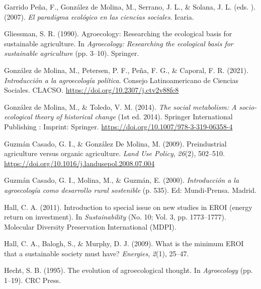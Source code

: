 \documentclass[a4paper, nobind]{templates/ociamthesis}
\newlength{\cslhangindent}
\newenvironment{CSLReferences}[2] %
 {%
  \setlength{\parindent}{0pt}
  \ifodd #1
  \let\oldpar\par
  \def\par{\hangindent=\cslhangindent\oldpar}
  \fi
  \setlength{\parskip}{1mm}
  \setlength{\baselineskip}{6mm}
 }%
 {}
\begin{document}
\begin{CSLReferences}{1}{0}
\leavevmode{}%
Garrido Peña, F., González de Molina, M., Serrano, J. L., \& Solana, J. L. (eds. ). (2007). \emph{El paradigma ecológico en las ciencias sociales}. Icaria.

\leavevmode{}%
Gliessman, S. R. (1990). Agroecology: Researching the ecological basis for sustainable agriculture. In \emph{Agroecology: Researching the ecological basis for sustainable agriculture} (pp. 3--10). Springer.

\leavevmode{}%
González de Molina, M., Petersen, P. F., Peña, F. G., \& Caporal, F. R. (2021). \emph{Introducción a la agroecología política}. Consejo Latinoamericano de Ciencias Sociales. CLACSO. \url{https://doi.org/10.2307/j.ctv2v88fc8}

\leavevmode{}%
González de Molina, M., \& Toledo, V. M. (2014). \emph{The social metabolism: A socio-ecological theory of historical change} (1st ed. 2014). Springer International Publishing : Imprint: Springer. \url{https://doi.org/10.1007/978-3-319-06358-4}

\leavevmode{}%
Guzmán Casado, G. I., \& González De Molina, M. (2009). Preindustrial agriculture versus organic agriculture. \emph{Land Use Policy}, \emph{26}(2), 502--510. \url{https://doi.org/10.1016/j.landusepol.2008.07.004}

\leavevmode{}%
Guzmán Casado, G. I., Molina, M., \& Guzmán, E. (2000). \emph{Introducción a la agroecología como desarrollo rural sostenible} (p. 535). Ed: Mundi-Prensa. Madrid.

\leavevmode{}%
Hall, C. A. (2011). Introduction to special issue on new studies in EROI (energy return on investment). In \emph{Sustainability} (No. 10; Vol. 3, pp. 1773--1777). Molecular Diversity Preservation International (MDPI).

\leavevmode{}%
Hall, C. A., Balogh, S., \& Murphy, D. J. (2009). What is the minimum EROI that a sustainable society must have? \emph{Energies}, \emph{2}(1), 25--47.

\leavevmode{}%
Hecht, S. B. (1995). The evolution of agroecological thought. In \emph{Agroecology} (pp. 1--19). CRC Press.


\end{CSLReferences}
\end{document}
